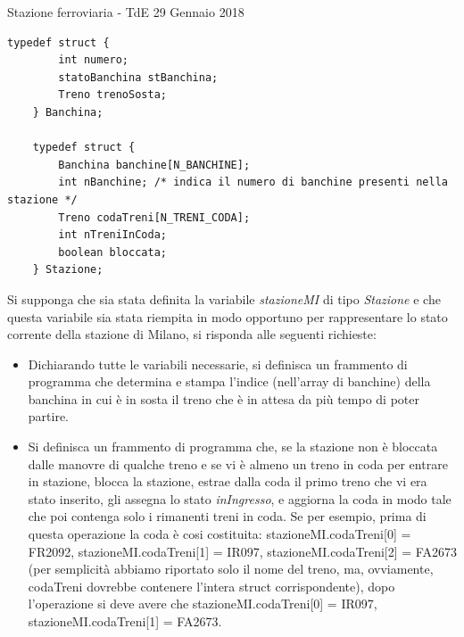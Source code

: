 \documentclass[aspectratio=169, handout]{beamer}
\begin{document}
\begin{frame}{Stazione ferroviaria - TdE 29 Gennaio 2018}
\begin{lstlisting}[style=CStyle, basicstyle=\small]
    typedef struct {
        int numero;
        statoBanchina stBanchina;
        Treno trenoSosta;
    } Banchina;

    typedef struct {
        Banchina banchine[N_BANCHINE];
        int nBanchine; /* indica il numero di banchine presenti nella stazione */
        Treno codaTreni[N_TRENI_CODA];
        int nTreniInCoda;
        boolean bloccata;
    } Stazione;
    \end{lstlisting}

    Si supponga che sia stata definita la variabile \emph{stazioneMI} di tipo \emph{Stazione} e che questa variabile sia stata riempita in modo opportuno per rappresentare lo stato corrente della stazione di Milano, si risponda alle seguenti richieste:
    \begin{itemize}
        \item Dichiarando tutte le variabili necessarie, si definisca un frammento di programma che determina e stampa l'indice (nell’array di banchine) della banchina in cui è in sosta il treno che è in attesa da più tempo di poter partire.
        \item Si definisca un frammento di programma che, se la stazione non è bloccata dalle manovre di qualche treno e se vi è almeno un treno in coda per entrare in stazione, blocca la stazione, estrae dalla coda il primo treno che vi era stato inserito, gli assegna lo stato \emph{inIngresso}, e aggiorna la coda in modo tale che poi contenga solo i rimanenti treni in coda. Se per esempio, prima di questa operazione la coda è cosi costituita: stazioneMI.codaTreni[0] = FR2092, stazioneMI.codaTreni[1] = IR097, stazioneMI.codaTreni[2] = FA2673 (per semplicità abbiamo riportato solo il nome del treno, ma, ovviamente, codaTreni dovrebbe contenere l’intera struct corrispondente), dopo l’operazione si deve avere che stazioneMI.codaTreni[0] = IR097, stazioneMI.codaTreni[1] = FA2673.
    \end{itemize}
\end{frame}
\end{document}
